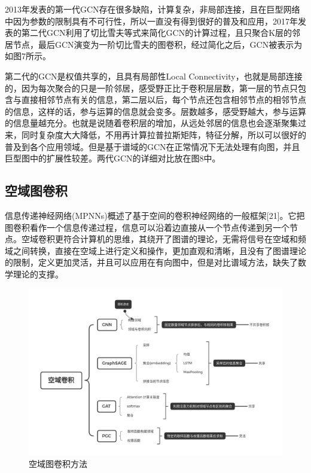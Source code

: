 \documentclass[10pt,journal,compsoc]{IEEEtran}
\begin{document}
2013年发表的第一代GCN存在很多缺陷，计算复杂，非局部连接，且在巨型网络中因为参数的限制具有不可行性，所以一直没有得到很好的普及和应用，2017年发表的第二代GCN利用了切比雪夫等式来简化GCN的计算过程，且只聚合K层的邻居节点，最后GCN演变为一阶切比雪夫的图卷积，经过简化之后，GCN被表示为如图7所示。


第二代的GCN是权值共享的，且具有局部性Local Connectivity，也就是局部连接的，因为每次聚合的只是一阶邻居，感受野正比于卷积层层数，第一层的节点只包含与直接相邻节点有关的信息，第二层以后，每个节点还包含相邻节点的相邻节点的信息，这样的话，参与运算的信息就会变多。层数越多，感受野越大，参与运算的信息量越充分。也就是说随着卷积层的增加，从远处邻居的信息也会逐渐聚集过来，同时复杂度大大降低，不用再计算拉普拉斯矩阵，特征分解，所以可以很好的普及到各个应用领域。但是基于谱域的GCN在正常情况下无法处理有向图，并且巨型图中的扩展性较差。两代GCN的详细对比放在图8中。

\subsection{空域图卷积}

信息传递神经网络(MPNNs)概述了基于空间的卷积神经网络的一般框架[21]。它把图卷积看作一个信息传递过程，信息可以沿着边直接从一个节点传递到另一个节点。空域卷积更符合计算机的思维，其绕开了图谱的理论，无需将信号在空域和频域之间转换，直接在空域上进行定义和操作，更加直观和清晰，且没有了图谱理论的限制，定义更加灵活，并且可以应用在有向图中，但是对比谱域方法，缺失了数学理论的支撑。
\begin{figure}
	\centering
	\includegraphics[width=1\textwidth]{2-7}
	\caption{空域图卷积方法}
	\label{fig:空域图卷积方法}
\end{figure}
\end{document}

